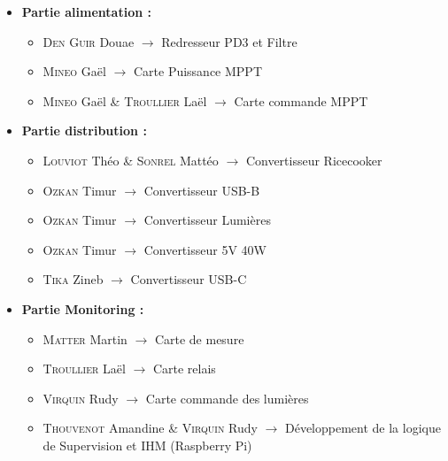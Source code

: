 \begin{itemize}
    \item \textbf{Partie alimentation :}
    \begin{itemize}
        \item \textsc{Den Guir} Douae $\rightarrow$ Redresseur PD3 et Filtre
        \item \textsc{Mineo} Gaël $\rightarrow$ Carte Puissance MPPT
        \item \textsc{Mineo} Gaël \& \textsc{Troullier} Laël $\rightarrow$ Carte commande MPPT
    \end{itemize}
    
    \item \textbf{Partie distribution :}
    \begin{itemize}
        \item \textsc{Louviot} Théo \& \textsc{Sonrel} Mattéo $\rightarrow$ Convertisseur Ricecooker
        \item \textsc{Ozkan} Timur $\rightarrow$ Convertisseur USB-B
        \item \textsc{Ozkan} Timur $\rightarrow$ Convertisseur Lumières
        \item \textsc{Ozkan} Timur $\rightarrow$ Convertisseur 5V 40W
        \item \textsc{Tika} Zineb $\rightarrow$ Convertisseur USB-C
    \end{itemize}
    
    \item \textbf{Partie Monitoring :}
    \begin{itemize}
        \item \textsc{Matter} Martin $\rightarrow$ Carte de mesure
        \item \textsc{Troullier} Laël $\rightarrow$ Carte relais
        \item \textsc{Virquin} Rudy $\rightarrow$ Carte commande des lumières
        \item \textsc{Thouvenot} Amandine \& \textsc{Virquin} Rudy $\rightarrow$ Développement de la logique de Supervision et IHM (Raspberry Pi)
    \end{itemize}
\end{itemize}

